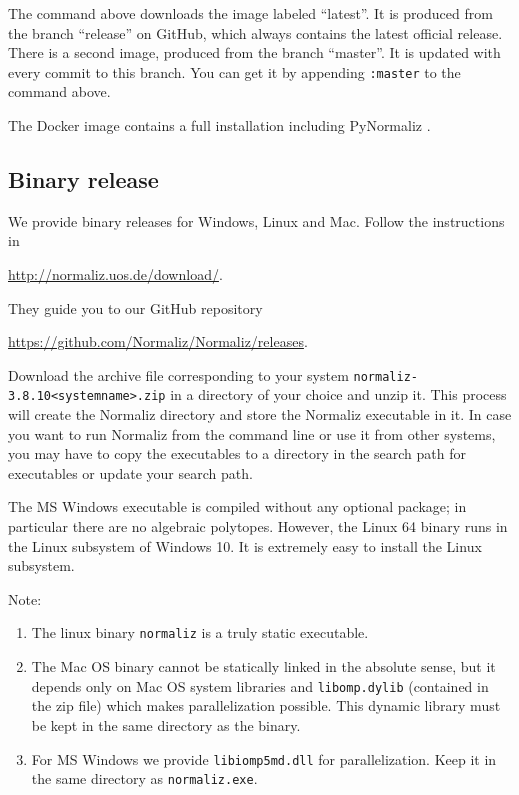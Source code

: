 \documentclass[12pt,a4paper]{scrartcl}
\theoremstyle{definition}
\def\ttt{\texttt}
\def\version{3.8.10}
\def\NmzDir{normaliz-\version}
\begin{document}
The command above downloads the image labeled ``latest''. It is produced from the branch ``release'' on GitHub, which always contains the latest official release. There is a second image, produced from the branch ``master''. It is updated with every commit to this branch. You can get it by appending \verb|:master| to the command above.

The Docker image contains a full installation including PyNormaliz .

\subsection{Binary release}

We provide binary releases for Windows, Linux and Mac. Follow the instructions in
\begin{center}
	\url{http://normaliz.uos.de/download/}.
\end{center}
They guide you to our GitHub repository
\begin{center}
	\url{https://github.com/Normaliz/Normaliz/releases}.
\end{center}

Download the archive file
corresponding to your system \ttt{\NmzDir<systemname>.zip} in a directory of your choice 
and unzip it. This process will create  the Normaliz directory and store the Normaliz executable in it. In case you want to run Normaliz from the
command line or use it from other systems, you may have to copy
the executables to a directory in the search path for executables or update your search path.

The MS Windows executable is compiled without any optional package; in particular there are no algebraic polytopes. However, the Linux 64 binary runs in the Linux subsystem of Windows 10. It is extremely easy to install the Linux subsystem.

Note:
\begin{enumerate}
	\item The linux binary \verb|normaliz| is a truly static executable. 
	
	\item The Mac OS binary cannot be statically linked in the absolute sense, but it depends only on Mac OS system libraries and \verb|libomp.dylib| (contained in the zip file) which makes parallelization possible. This dynamic library must be kept in the same directory as the binary.
	
	\item For MS Windows we provide \verb|libiomp5md.dll| for parallelization. Keep it in the same directory as \verb|normaliz.exe|.
\end{enumerate}
\end{document}
